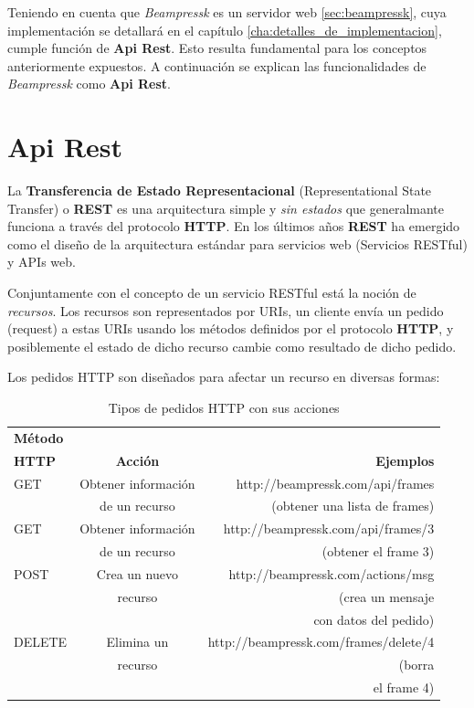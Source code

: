  	Teniendo en cuenta que \textit{Beampressk} es un servidor web \ref{sec:beampressk}, cuya implementación se detallará en el capítulo \ref{cha:detalles_de_implementacion}, cumple función de \textbf{Api Rest}. Esto resulta fundamental para los conceptos anteriormente expuestos. A continuación se explican las funcionalidades de \textit{Beampressk} como \textbf{Api Rest}.
	

	\section{Api Rest} %
	\label{sec:api_rest}
		La \textbf{Transferencia de Estado Representacional} (Representational State Transfer) o \textbf{REST} es una arquitectura simple y \textit{sin estados} que generalmante funciona a través del protocolo \textbf{HTTP}. En los últimos años \textbf{REST} ha emergido como el diseño de la arquitectura estándar para servicios web (Servicios RESTful) y APIs web.

		Conjuntamente con el concepto de un servicio RESTful está la noción de \textit{recursos}. Los recursos son representados por URIs, un cliente envía un pedido (request) a estas URIs usando los métodos definidos por el protocolo \textbf{HTTP}, y posiblemente el estado de dicho recurso cambie como resultado de dicho pedido.

		Los pedidos HTTP son diseñados para afectar un recurso en diversas formas:

		\begin{table}[tb]
			\caption{Tipos de pedidos HTTP con sus acciones}
			\label{tab:request}
			\centering
		
			\begin{tabular}{l|c|r}
			\hline
		
			\hline
			\textbf{Método} & & \\ 
			\textbf{HTTP} & \textbf{Acción} & \textbf{Ejemplos} \\
			\hline
				GET & Obtener información &  http://beampressk.com/api/frames \\ 
				& de un recurso & (obtener una lista de frames) \\
			\hline

			\hline
				GET & Obtener información &  http://beampressk.com/api/frames/3 \\ 
				& de un recurso & (obtener el frame 3) \\
			\hline

			\hline
				POST & Crea un nuevo &  http://beampressk.com/actions/msg \\ 
				& recurso & (crea un mensaje \\ 
				& &con datos del pedido)\\
			\hline

			\hline
				DELETE & Elimina un &  http://beampressk.com/frames/delete/4 \\ 
				& recurso & (borra \\ 
				& &el frame 4)\\
			\hline										
		
			\hline
			\end{tabular}
		\end{table}
		

